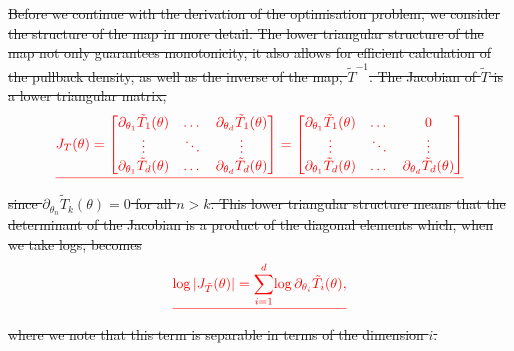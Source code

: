 \documentclass[final]{siamltex}
\providecommand{\DIFdel}[1]{{\protect\color{red}\sout{#1}}}                      %
\providecommand{\DIFdelbegin}{} %
\providecommand{\DIFdelend}{} %
\newcommand{\DIFscaledelfig}{0.5}
\newlength{\DIFdelgraphicswidth} %
\newlength{\DIFdelgraphicsheight} %
\newcommand{\DIFdelincludegraphics}[2][]{%
\sbox{\DIFdelgraphicsbox}{\DIFOincludegraphics[#1]{#2}}%
\settoboxwidth{\DIFdelgraphicswidth}{\DIFdelgraphicsbox} %
\settoboxtotalheight{\DIFdelgraphicsheight}{\DIFdelgraphicsbox} %
\scalebox{\DIFscaledelfig}{%
\parbox[b]{\DIFdelgraphicswidth}{\usebox{\DIFdelgraphicsbox}\\[-\baselineskip] \rule{\DIFdelgraphicswidth}{0em}}\llap{\resizebox{\DIFdelgraphicswidth}{\DIFdelgraphicsheight}{%
\setlength{\unitlength}{\DIFdelgraphicswidth}%
\begin{picture}(1,1)%
\thicklines\linethickness{2pt} %
{\color[rgb]{1,0,0}\put(0,0){\framebox(1,1){}}}%
{\color[rgb]{1,0,0}\put(0,0){\line( 1,1){1}}}%
{\color[rgb]{1,0,0}\put(0,1){\line(1,-1){1}}}%
\end{picture}%
}\hspace*{3pt}}} %
} %
\DeclareRobustCommand{\DIFdelbegin}{\DIFOdelbegin \let\includegraphics\DIFdelincludegraphics} %
\DeclareRobustCommand{\DIFdelend}{\DIFOaddend \let\includegraphics\DIFOincludegraphics} %
\begin{document}
\DIFdelbegin \DIFdel{Before we continue with the derivation of the optimisation problem, we consider the structure
of the map in more detail. The lower triangular structure of the map not only guarantees monotonicity, it also allows for efficient calculation of the pullback density, as well as the inverse of the map, $\tilde{T}^{-1}$. The Jacobian of $\tilde{T}$ is a lower triangular matrix,
}\[
	\DIFdel{J_T(\theta) = \begin{bmatrix}
		\partial_{\theta_1} \tilde{T}_1(\theta) & \dots & \partial_{\theta_d} \tilde{T}_1(\theta)\\
		\vdots & \ddots & \vdots \\
		\partial_{\theta_1} \tilde{T}_d(\theta) & \dots & \partial_{\theta_d} \tilde{T}_d(\theta)
	\end{bmatrix} = \begin{bmatrix}
		\partial_{\theta_1} \tilde{T}_1(\theta) & \dots & 0\\
		\vdots & \ddots & \vdots \\
		\partial_{\theta_1} \tilde{T}_d(\theta) & \dots & \partial_{\theta_d} \tilde{T}_d(\theta)
	\end{bmatrix}
}\]
\DIFdel{since $\partial_{\theta_n} \tilde{T}_k(\theta) = 0$ for all $n > k$. This lower triangular structure means that the determinant of the Jacobian is a product of the diagonal elements which, when we take logs, becomes
}\begin{displaymath}\DIFdel{
	\log\left|J_{\tilde{T}}(\theta)\right| = \sum\limits_{i=1}^d \! \log \partial_{\theta_i} \tilde{T}_i(\theta),
}\end{displaymath}
\DIFdel{where we note that this term is separable in terms of the dimension $i$.
}\DIFdelend %
\end{document}
